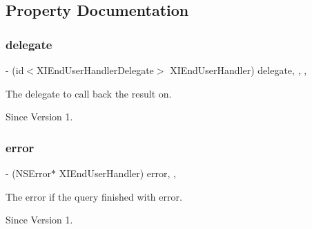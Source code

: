 \subsection{Property Documentation}
\hypertarget{protocol_x_i_end_user_handler_01-p_a38588dbfe6280be2eed34e608014254a}{}\label{protocol_x_i_end_user_handler_01-p_a38588dbfe6280be2eed34e608014254a} 
\subsubsection{\texorpdfstring{delegate}{delegate}}
{\footnotesize\ttfamily -\/ (id$<$X\+I\+End\+User\+Handler\+Delegate$>$ X\+I\+End\+User\+Handler) delegate\hspace{0.3cm}{\ttfamily [read]}, {\ttfamily [write]}, {\ttfamily [nonatomic]}, {\ttfamily [weak]}}



The delegate to call back the result on. 

\begin{DoxySince}{Since}
Version 1. 
\end{DoxySince}
\hypertarget{protocol_x_i_end_user_handler_01-p_aaf0dc6bc3975d900542b83e8610b7450}{}\label{protocol_x_i_end_user_handler_01-p_aaf0dc6bc3975d900542b83e8610b7450} 
\subsubsection{\texorpdfstring{error}{error}}
{\footnotesize\ttfamily -\/ (N\+S\+Error$\ast$ X\+I\+End\+User\+Handler) error\hspace{0.3cm}{\ttfamily [read]}, {\ttfamily [nonatomic]}, {\ttfamily [assign]}}



The error if the query finished with error. 

\begin{DoxySince}{Since}
Version 1. 
\end{DoxySince}
\hypertarget{protocol_x_i_end_user_handler_01-p_a6a1286cca57fb37d1de44fc55446df6d}{}\label{protocol_x_i_end_user_handler_01-p_a6a1286cca57fb37d1de44fc55446df6d} 
